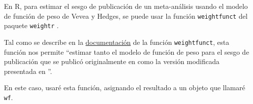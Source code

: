 \documentclass[
  bookmarksnumbered]{article}
\newenvironment{Shaded}{\begin{snugshade}}{\end{snugshade}}
\newcommand{\AttributeTok}[1]{\textcolor[rgb]{0.00,0.34,0.68}{#1}}
\newcommand{\ConstantTok}[1]{\textcolor[rgb]{0.67,0.33,0.00}{#1}}
\newcommand{\FunctionTok}[1]{\textcolor[rgb]{0.39,0.29,0.61}{#1}}
\newcommand{\NormalTok}[1]{\textcolor[rgb]{0.12,0.11,0.11}{#1}}
\newcommand{\OtherTok}[1]{\textcolor[rgb]{0.00,0.43,0.16}{#1}}
\newcommand{\SpecialCharTok}[1]{\textcolor[rgb]{0.24,0.68,0.91}{#1}}
\begin{document}
En R, para estimar el sesgo de publicación de un meta-análisis usando el modelo de función de peso de Vevea y Hedges, se puede usar la función \texttt{weightfunct} del paquete \texttt{weightr} \autocite{coburnWeightr2019}.

Tal como se describe en la \href{https://www.rdocumentation.org/packages/weightr/versions/2.0.2/topics/weightfunct}{documentación} de la función \texttt{weightfunct}, esta función nos permite ``estimar tanto el modelo de función de peso para el sesgo de publicación que se publicó originalmente en \textcite{veveaGeneralLinearModel1995} como la versión modificada presentada en \textcite{veveaPublicationBiasResearch2005}''.

En este caso, usaré esta función, asignando el resultado a un objeto que llamaré \texttt{wf}.

\begin{Shaded}
\end{Shaded}
\end{document}
